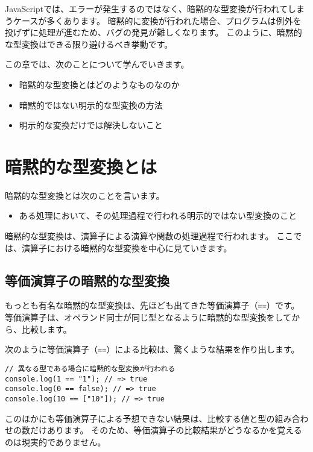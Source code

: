 JavaScriptでは、エラーが発生するのではなく、暗黙的な型変換が行われてしまうケースが多くあります。
暗黙的に変換が行われた場合、プログラムは例外を投げずに処理が進むため、バグの発見が難しくなります。
このように、暗黙的な型変換はできる限り避けるべき挙動です。

この章では、次のことについて学んでいきます。

\begin{itemize}
\item
  暗黙的な型変換とはどのようなものなのか
\item
  暗黙的ではない明示的な型変換の方法
\item
  明示的な変換だけでは解決しないこと
\end{itemize}

\hypertarget{what-is-implicit-coercion}{%
\section{暗黙的な型変換とは}\label{what-is-implicit-coercion}}

暗黙的な型変換とは次のことを言います。

\begin{itemize}
\item
  ある処理において、その処理過程で行われる明示的ではない型変換のこと
\end{itemize}

暗黙的な型変換は、演算子による演算や関数の処理過程で行われます。
ここでは、演算子における暗黙的な型変換を中心に見ていきます。

\hypertarget{implicit-coercion-of-equal-operator}{%
\subsection{等価演算子の暗黙的な型変換}\label{implicit-coercion-of-equal-operator}}

もっとも有名な暗黙的な型変換は、先ほども出てきた等価演算子（\texttt{==}）です。
等価演算子は、オペランド同士が同じ型となるように暗黙的な型変換をしてから、比較します。

次のように等価演算子（\texttt{==}）による比較は、驚くような結果を作り出します。

\begin{lstlisting}
// 異なる型である場合に暗黙的な型変換が行われる
console.log(1 == "1"); // => true
console.log(0 == false); // => true
console.log(10 == ["10"]); // => true
\end{lstlisting}

このほかにも等価演算子による予想できない結果は、比較する値と型の組み合わせの数だけあります。
そのため、等価演算子の比較結果がどうなるかを覚えるのは現実的でありません。

